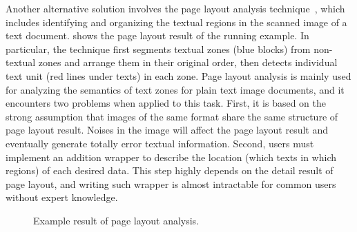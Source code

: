 Another alternative solution involves the page layout analysis technique~\cite{o1993document},
which includes identifying and organizing the textual regions
in the scanned image of a text document.
 shows the page layout result of the running example.
In particular, the technique first segments textual zones (blue blocks) from
non-textual zones and arrange them in their original order,
then detects individual text unit (red lines under texts) in each zone.
Page layout analysis is mainly used for analyzing the semantics of text zones
for plain text image documents,
and it encounters two problems when applied to this task.
First, it is based on the strong assumption that images of the same format
share the same structure of page layout result.
Noises in the image will affect the page layout result and
eventually generate totally error textual information.
Second, users must implement an addition wrapper to describe the location
(which texts in which regions) of each desired data.
This step highly depends on the detail result of page layout,
and writing such wrapper is almost intractable
for common users without expert knowledge.
\begin{figure*}[ht]
\centering
{}
\caption{Example result of page layout analysis.}
\label{fig:running-page-layout}
\end{figure*}

